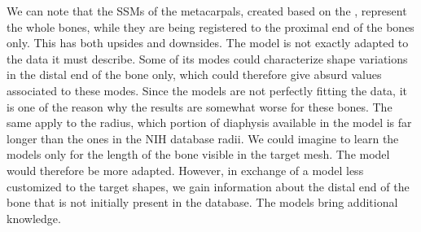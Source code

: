 We can note that the SSMs of the metacarpals, created based on the \db*, represent the whole bones, while they are being registered to the proximal end of the bones only. This has both upsides and downsides. The model is not exactly adapted to the data it must describe. Some of its modes could characterize shape variations in the distal end of the bone only, which could therefore give absurd values associated to these modes. Since the models are not perfectly fitting the data, it is one of the reason why the results are somewhat worse for these bones. The same apply to the radius, which portion of diaphysis available in the model is far longer than the ones in the NIH database radii. We could imagine to learn the models only for the length of the bone visible in the target mesh. The model would therefore be more adapted. However, in exchange of a model less customized to the target shapes, we gain information about the distal end of the bone that is not initially present in the database. The models bring additional knowledge.  




